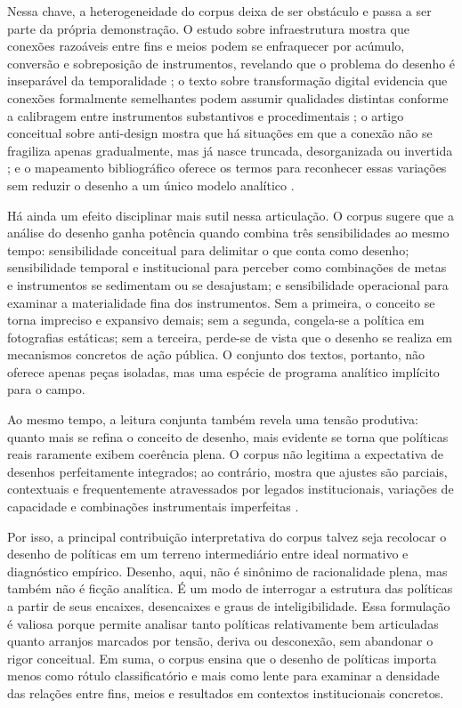 \documentclass[12pt,a4paper]{article}
\begin{document}
Nessa chave, a heterogeneidade do corpus deixa de ser obstáculo e passa a ser parte da própria demonstração. O estudo sobre infraestrutura mostra que conexões razoáveis entre fins e meios podem se enfraquecer por acúmulo, conversão e sobreposição de instrumentos, revelando que o problema do desenho é inseparável da temporalidade \parencite{geet2019_policy_design}; o texto sobre transformação digital evidencia que conexões formalmente semelhantes podem assumir qualidades distintas conforme a calibragem entre instrumentos substantivos e procedimentais \parencite{lui2026_micro_dimensions}; o artigo conceitual sobre anti-design mostra que há situações em que a conexão não se fragiliza apenas gradualmente, mas já nasce truncada, desorganizada ou invertida \parencite{newman2020_policy_design}; e o mapeamento bibliográfico oferece os termos para reconhecer essas variações sem reduzir o desenho a um único modelo analítico \parencite{lima2021_conectando_problemas}.

Há ainda um efeito disciplinar mais sutil nessa articulação. O corpus sugere que a análise do desenho ganha potência quando combina três sensibilidades ao mesmo tempo: sensibilidade conceitual para delimitar o que conta como desenho; sensibilidade temporal e institucional para perceber como combinações de metas e instrumentos se sedimentam ou se desajustam; e sensibilidade operacional para examinar a materialidade fina dos instrumentos. Sem a primeira, o conceito se torna impreciso e expansivo demais; sem a segunda, congela-se a política em fotografias estáticas; sem a terceira, perde-se de vista que o desenho se realiza em mecanismos concretos de ação pública. O conjunto dos textos, portanto, não oferece apenas peças isoladas, mas uma espécie de programa analítico implícito para o campo.

Ao mesmo tempo, a leitura conjunta também revela uma tensão produtiva: quanto mais se refina o conceito de desenho, mais evidente se torna que políticas reais raramente exibem coerência plena. O corpus não legitima a expectativa de desenhos perfeitamente integrados; ao contrário, mostra que ajustes são parciais, contextuais e frequentemente atravessados por legados institucionais, variações de capacidade e combinações instrumentais imperfeitas \parencite{geet2019_policy_design,lui2026_micro_dimensions,newman2020_policy_design}.

Por isso, a principal contribuição interpretativa do corpus talvez seja recolocar o desenho de políticas em um terreno intermediário entre ideal normativo e diagnóstico empírico. Desenho, aqui, não é sinônimo de racionalidade plena, mas também não é ficção analítica. É um modo de interrogar a estrutura das políticas a partir de seus encaixes, desencaixes e graus de inteligibilidade. Essa formulação é valiosa porque permite analisar tanto políticas relativamente bem articuladas quanto arranjos marcados por tensão, deriva ou desconexão, sem abandonar o rigor conceitual. Em suma, o corpus ensina que o desenho de políticas importa menos como rótulo classificatório e mais como lente para examinar a densidade das relações entre fins, meios e resultados em contextos institucionais concretos.
\end{document}
